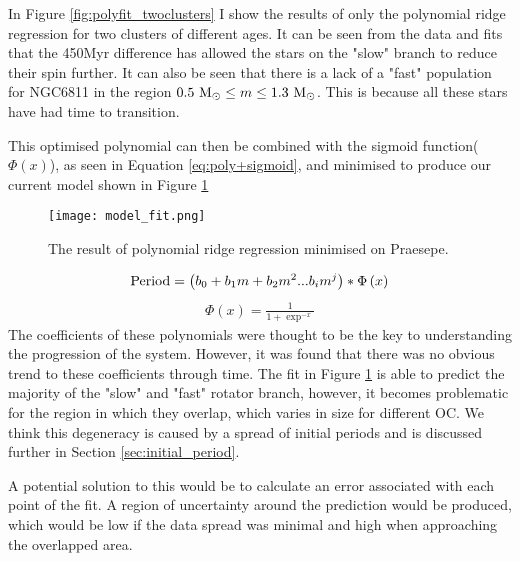 \documentclass[fleqn,usenatbib]{mnras}
\begin{document}
{In Figure \ref{fig:polyfit_twoclusters} I show the results of only the polynomial ridge regression for two clusters of different ages.
It can be seen from the data and fits that the 450Myr difference has allowed the stars on the "slow" branch to reduce their spin further.
It can also be seen that there is a lack of a "fast" population for NGC6811 in the region $0.5~\textup{M}_\odot \leq m \leq 1.3~\textup{M}_\odot$.
This is because all these stars have had time to transition.

This optimised polynomial can then be combined with the sigmoid function($\Phi\left(x\right)$), as seen in Equation \ref{eq:poly+sigmoid}, and minimised to produce our current model shown in Figure \ref{fig:model_fit}
\begin{figure}
	\texttt{[image: model\_fit.png]}
	\caption{The result of polynomial ridge regression minimised on Praesepe.}
	\label{fig:model_fit}
\end{figure}
\begin{align}
	\label{eq:poly+sigmoid}
	\textup{Period} = \left(b_0 + b_1m + b_2m^2...b_im^j\right)*\Phi\left(x\right) 
\end{align}
\begin{align}
	\label{eq:sigmoid}
	\Phi\left(x\right) = \frac{1}{1 + \exp^{-x}}
\end{align}
The coefficients of these polynomials were thought to be the key to understanding the progression of the system.
However, it was found that there was no obvious trend to these coefficients through time.
The fit in Figure \ref{fig:model_fit} is able to predict the majority of the "slow" and "fast" rotator branch, however, it becomes problematic for the region in which they overlap, which varies in size for different OC.
We think this degeneracy is caused by a spread of initial periods and is discussed further in Section \ref{sec:initial_period}.

A potential solution to this would be to calculate an error associated with each point of the fit.
A region of uncertainty around the prediction would be produced, which would be low if the data spread was minimal and high when approaching the overlapped area.

}
\end{document}

